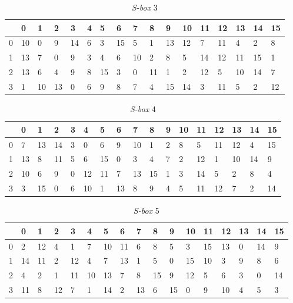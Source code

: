 \begin{enumerate}
\begin{table}[H]
	\begin{center}
		\begin{tabular}{|l|l|l|l|l|l|l|l|l|l|l|l|l|l|l|l|l|}
				\hline
				& 0 & 1	& 2 & 3 & 4 & 5 & 6 & 7 & 8 & 9 & 10 & 11 & 12 & 13 & 14 & 15	\\ \hline
			0 & 10 & 0 & 9 & 14 & 6 & 3 & 15 & 5 & 1 & 13 & 12 & 7 & 11 & 4 & 2 & 8	\\ \hline
			1 & 13 & 7 & 0 & 9 & 3 & 4 & 6 & 10 & 2 & 8 & 5 & 14 & 12 & 11 & 15 & 1	\\ \hline
			2 & 13 & 6 & 4 & 9 & 8 & 15 & 3 & 0 & 11 & 1 & 2 & 12 & 5 & 10 & 14 & 7	\\ \hline
			3 & 1 & 10 & 13 & 0 & 6 & 9 & 8 & 7 & 4 & 15 & 14 & 3 & 11 & 5 & 2 & 12	\\ \hline
		\end{tabular}
	\end{center}
	\label{table:s_box3}
	\caption{\textit{S-box} 3}
\end{table}

\begin{table}[H]
	\begin{center}
		\begin{tabular}{|l|l|l|l|l|l|l|l|l|l|l|l|l|l|l|l|l|}
				\hline
				& 0 & 1	& 2 & 3 & 4 & 5 & 6 & 7 & 8 & 9 & 10 & 11 & 12 & 13 & 14 & 15	\\ \hline
			0 & 7	&	13	&	14	&	3	&	0	&	6	&	9	&	10	&	1	&	2	&	8	&	5	&	11	&	12	&	4	&	15	\\ \hline
			1 & 13	&	8	&	11	&	5	&	6	&	15	&	0	&	3	&	4	&	7	&	2	&	12	&	1	&	10	&	14	&	9	\\ \hline
			2 & 10	&	6	&	9	&	0	&	12	&	11	&	7	&	13	&	15	&	1	&	3	&	14	&	5	&	2	&	8	&	4	\\ \hline
			3 & 3	&	15	&	0	&	6	&	10	&	1	&	13	&	8	&	9	&	4	&	5	&	11	&	12	&	7	&	2	&	14	\\ \hline
		\end{tabular}
	\end{center}
	\label{table:s_box4}
	\caption{\textit{S-box} 4}
\end{table}

\begin{table}[H]
	\begin{center}
		\begin{tabular}{|l|l|l|l|l|l|l|l|l|l|l|l|l|l|l|l|l|}
				\hline
				& 0 & 1	& 2 & 3 & 4 & 5 & 6 & 7 & 8 & 9 & 10 & 11 & 12 & 13 & 14 & 15	\\ \hline
			0	&	2	&	12	&	4	&	1	&	7	&	10	&	11	&	6	&	8	&	5	&	3	&	15	&	13	&	0	&	14	&	9	\\ \hline
			1	&	14	&	11	&	2	&	12	&	4	&	7	&	13	&	1	&	5	&	0	&	15	&	10	&	3	&	9	&	8	&	6	\\ \hline
			2	&	4	&	2	&	1	&	11	&	10	&	13	&	7	&	8	&	15	&	9	&	12	&	5	&	6	&	3	&	0	&	14	\\ \hline
			3	&	11	&	8	&	12	&	7	&	1	&	14	&	2	&	13	&	6	&	15	&	0	&	9	&	10	&	4	&	5	&	3	\\ \hline
		\end{tabular}
	\end{center}
	\label{table:s_box5}
	\caption{\textit{S-box} 5}
\end{table}


\end{enumerate}
